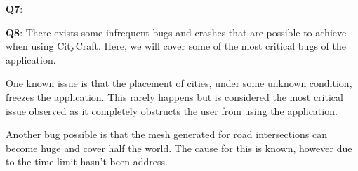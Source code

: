 \textbf{Q7}: \newline

\textbf{Q8}: \newline
There exists some infrequent bugs and crashes that are possible to achieve when using CityCraft.
Here, we will cover some of the most critical bugs of the application.

One known issue is that the placement of cities, under some unknown condition, freezes the application.
This rarely happens but is considered the most critical issue observed as it completely obstructs the user from using the application.

Another bug possible is that the mesh generated for road intersections can become huge and cover half the world.
The cause for this is known, however due to the time limit hasn't been address.


